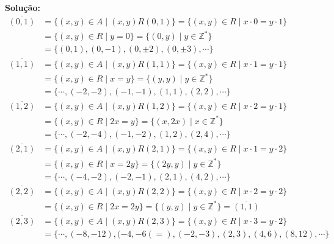 \documentclass[12pt]{article}
\newcommand{\z}{\mathbb{Z}}
\begin{document}
\begin{enumerate}[label={\alph*})]
\noindent\textbf{Solu\c{c}\~ao:}
\begin{align*}
	\overline{(0,1)} &= \{ (x, y) \in A \mid (x,y)R(0,1)\} = \{ (x,y) \in R \mid x\cdot 0 = y\cdot 1\} \\ &= \{ (x,y) \in R \mid y = 0 \} = \{(0, y) \mid y \in \z^*\} \\ &= \{ (0,1), (0,-1), (0,\pm 2) , (0, \pm 3), \cdots\}\\
	\overline{(1,1)} &= \{ (x, y) \in A \mid (x,y)R(1,1)\} = \{ (x,y) \in R \mid x\cdot 1 = y\cdot 1\} \\ &= \{ (x,y) \in R \mid x = y \} = \{(y, y) \mid y \in \z^*\} \\ &= \{\cdots, (-2,-2), (-1,-1), (1,1), (2,2),\cdots\}\\
	\overline{(1,2)} &= \{ (x, y) \in A \mid (x,y)R(1,2)\} = \{ (x,y) \in R \mid x\cdot 2 = y\cdot 1\} \\ &= \{ (x,y) \in R \mid 2x = y \} = \{(x, 2x) \mid x \in \z^*\} \\ &= \{\cdots, (-2,-4), (-1,-2), (1,2), (2,4), \cdots\}\\
	\overline{(2,1)} &= \{ (x, y) \in A \mid (x,y)R(2,1)\} = \{ (x,y) \in R \mid x\cdot 1 = y\cdot 2\} \\ &= \{ (x,y) \in R \mid x = 2y \} = \{(2y, y) \mid y \in \z^*\} \\ &= \{\cdots, (-4,-2), (-2,-1), (2,1), (4,2), \cdots\}\\
	\overline{(2,2)} &= \{ (x, y) \in A \mid (x,y)R(2,2)\} = \{ (x,y) \in R \mid x\cdot 2 = y\cdot 2\} \\ &= \{ (x,y) \in R \mid 2x = 2y \} = \{(y, y) \mid y \in \z^*\} = \overline{(1,1)}\\
	\overline{(2,3)} &= \{ (x, y) \in A \mid (x,y)R(2,3)\} = \{ (x,y) \in R \mid x\cdot 3 = y\cdot 2\} \\ &= \{ \cdots,(-8,-12),(-4,-6(=),(-2,-3), (2,3), (4,6), (8,12), \cdots\}
\end{align*}
\end{enumerate}
\end{document}
